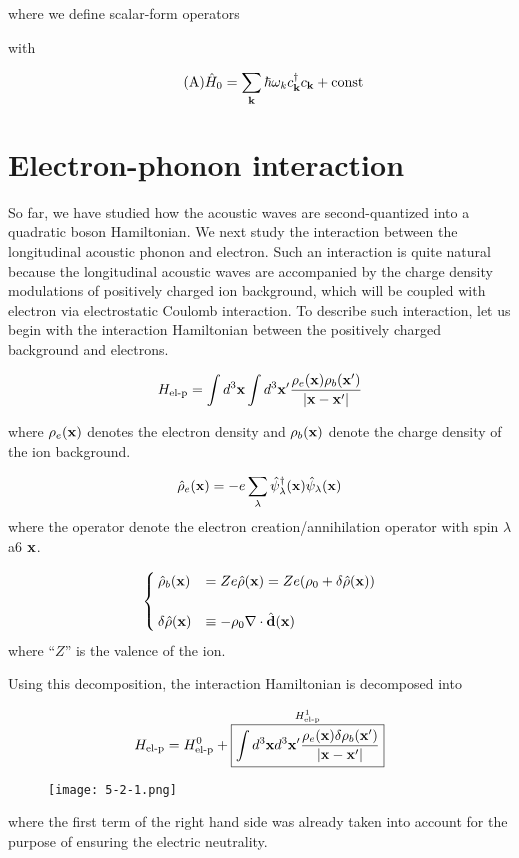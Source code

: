 where we define scalar-form operators





with

\begin{align}\tag{A}\label{5A}
\hat{H}_0 = \sum_{\bf k}\hbar\omega_k c_{\bf k}^\dagger c_{\bf k}+\text{const}
\end{align}

\section{Electron-phonon interaction} \label{se5-2}%

So far, we have studied how the acoustic waves are second-quantized into a quadratic boson Hamiltonian. We next study the interaction between the longitudinal acoustic phonon and electron. Such an interaction is quite natural because the longitudinal acoustic waves are accompanied by the charge density modulations of positively charged ion background, which will be coupled with electron via electrostatic Coulomb interaction. To describe such interaction, let us begin with the interaction Hamiltonian between the positively charged background and electrons. 

\[H_{\text{el-p}}=\int d^3{\bf x}\int d^3{\bf x'}\frac{\rho_e({\bf x})\rho_b({\bf x'})}{|\bf x-x'|} \]

where $\rho_e({\bf x})$ denotes the electron density and $\rho_b({\bf x})$ denote the charge density of the ion background. 

\[\hat{\rho}_e({\bf x}) = -e\sum_\lambda\hat{\psi}_\lambda^\dagger({\bf x})\hat{\psi}_\lambda({\bf x}) \]
where the operator denote the electron creation/annihilation operator with spin $\lambda$ a6 $\bf x$. 

\[\begin{cases}
\hat{\rho}_b({\bf x}) &= Ze\hat{\rho}({\bf x}) = Ze(\rho_0+\delta\hat{\rho}({\bf x}))\\
&\\
\delta\hat{\rho}({\bf x}) &\equiv-\rho_0\nabla\cdot\hat{\bf d}({\bf x})
\end{cases}\]
where ``$Z$'' is the valence of the ion. 

Using this decomposition, the interaction Hamiltonian is decomposed into

\[H_{\text{el-p}} = H_{\text{el-p}}^0 + \overset{H_{\text{el-p}}^1}{\fbox{$\displaystyle\int d^3{\bf x}d^3{\bf x'}\displaystyle\frac{\rho_e({\bf x})\delta\rho_b({\bf x'})}{|\bf x-x'|}$}} \]
\begin{wrapfigure}{r}{6cm}
\texttt{[image: 5-2-1.png]}
\end{wrapfigure}
where the first term of the right hand side was already taken into account for the purpose of ensuring the electric neutrality. 

